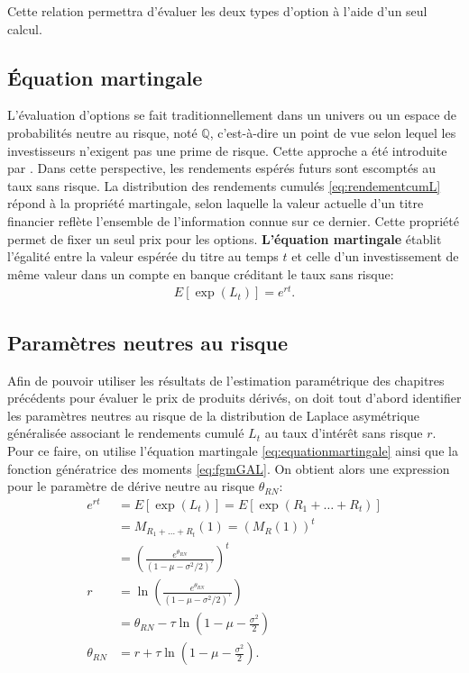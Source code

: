 Cette relation permettra d'évaluer les deux types d'option à l'aide
d'un seul calcul.

\subsection{Équation martingale}
\label{sec:equationmartingale}
L'évaluation d'options se fait traditionnellement dans un univers ou
un espace de probabilités neutre au risque, noté $\mathbb{Q}$,
c'est-à-dire un point de vue selon lequel les investisseurs n'exigent
pas une prime de risque. Cette approche a été introduite par
\cite{black1973pricing}. Dans cette perspective, les rendements
espérés futurs sont escomptés au taux sans risque. La distribution des
rendements cumulés \eqref{eq:rendementcumL} répond à la propriété
martingale, selon laquelle la valeur actuelle d'un titre financier
reflète l'ensemble de l'information connue sur ce dernier. Cette
propriété permet de fixer un seul prix pour les
options. \textbf{L'équation martingale} établit l'égalité entre la
valeur espérée du titre au temps $t$ et celle d'un investissement de
même valeur dans un compte en banque créditant le taux sans risque:
\begin{align}
  \label{eq:equationmartingale}
  E\left[\exp(L_t) \right] = e^{rt}.
\end{align}

\subsection{Paramètres neutres au risque}
\label{sec:GALrn}

Afin de pouvoir utiliser les résultats de l'estimation paramétrique
des chapitres précédents pour évaluer le prix de produits dérivés, on
doit tout d'abord identifier les paramètres neutres au risque de la
distribution de Laplace asymétrique généralisée associant le
rendements cumulé $L_t$ au taux d'intérêt sans risque $r$. Pour ce
faire, on utilise l'équation martingale \eqref{eq:equationmartingale}
ainsi que la fonction génératrice des moments \eqref{eq:fgmGAL}. On
obtient alors une expression pour le paramètre de dérive neutre au
risque $\theta_{RN}$:
\begin{align}
  e^{rt} &= E\left[\exp(L_t) \right]
  = E\left[\exp(R_1+\ldots+R_t) \right] \nonumber\\
  &= M_{R_1+\ldots+R_t}(1)
  = (M_{R}(1))^t \nonumber\\
  &= \left(\frac{e^{\theta_{RN}}}{(1-\mu-\sigma^2/2)^{\tau}} \right)^t \nonumber\\
  r &= \ln \left(\frac{e^{\theta_{RN}}}{(1-\mu-\sigma^2/2)^{\tau}} \right) \nonumber\\
  &= \theta_{RN} - \tau\ln(1-\mu-\frac{\sigma^2}{2}) \nonumber\\
  \theta_{RN} &= r +
  \tau\ln(1-\mu-\frac{\sigma^2}{2}). \label{eq:martingaleGAL}
\end{align}

